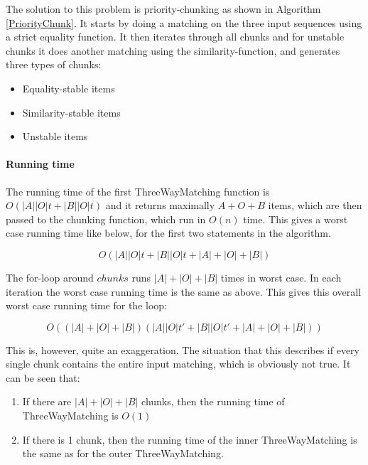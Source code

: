\documentclass[11pt]{article}
\begin{document}
The solution to this problem is priority-chunking as shown in Algorithm \ref{PriorityChunk}. It starts by doing a matching on the three input sequences using a strict equality function. It then iterates through all chunks and for unstable chunks it does another matching using the similarity-function, and generates three types of chunks:

\begin{itemize}
   \item Equality-stable items
   \item Similarity-stable items
   \item Unstable items
\end{itemize}


\paragraph{Running time} The running time of the first ThreeWayMatching function is  $O(|A||O|t + |B||O|t)$ and it returns maximally $A+O+B$ items, which are then passed to the chunking function, which run in $O(n)$ time. This gives a worst case running time like below, for the first two statements in the algorithm.

\begin{equation}
O(|A||O|t + |B||O|t + |A|+|O|+|B|) \nonumber
\end{equation}

The for-loop around $chunks$ runs $|A|+|O|+|B|$ times in worst case. In each iteration the worst case running time is the same as above. This gives this overall worst case running time for the loop:

\begin{equation}
O((|A| + |O| + |B|) (|A||O|t' + |B||O|t' + |A|+|O|+|B|)) \nonumber
\end{equation}

This is, however, quite an exaggeration. The situation that this describes if every single chunk contains the entire input matching, which is obviously not true. It can be seen that:

\begin{enumerate}
\item If there are $|A|+|O|+|B|$ chunks, then the running time of ThreeWayMatching is $O(1)$
\item If there is 1 chunk, then the running time of the inner ThreeWayMatching is the same as for the outer ThreeWayMatching.
\end{enumerate}
\end{document}
